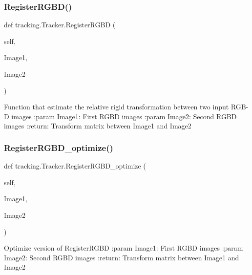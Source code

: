 \subsubsection{\texorpdfstring{Register\+R\+G\+B\+D()}{RegisterRGBD()}}
{\footnotesize\ttfamily def tracking.\+Tracker.\+Register\+R\+G\+BD (\begin{DoxyParamCaption}\item[{}]{self,  }\item[{}]{Image1,  }\item[{}]{Image2 }\end{DoxyParamCaption})}

\begin{DoxyVerb}Function that estimate the relative rigid transformation between two input RGB-D images
:param Image1: First RGBD images
:param Image2:  Second RGBD images
:return: Transform matrix between Image1 and Image2
\end{DoxyVerb}
 \mbox{\label{classtracking_1_1_tracker_a67305bad91e92f81957982b6b92556cc}} 
\subsubsection{\texorpdfstring{Register\+R\+G\+B\+D\+\_\+optimize()}{RegisterRGBD\_optimize()}}
{\footnotesize\ttfamily def tracking.\+Tracker.\+Register\+R\+G\+B\+D\+\_\+optimize (\begin{DoxyParamCaption}\item[{}]{self,  }\item[{}]{Image1,  }\item[{}]{Image2 }\end{DoxyParamCaption})}

\begin{DoxyVerb}Optimize version of  RegisterRGBD
:param Image1: First RGBD images
:param Image2:  Second RGBD images
:return: Transform matrix between Image1 and Image2
\end{DoxyVerb}
 \mbox{\label{classtracking_1_1_tracker_a99da5721b34cdb54cf89534ab2a77f35}} 
